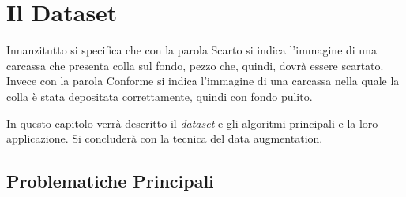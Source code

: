 
\chapter{Il Dataset}

Innanzitutto si specifica che con la parola Scarto si indica l'immagine di una carcassa che presenta colla sul fondo, pezzo che, quindi, dovrà essere scartato.
Invece con la parola Conforme si indica l'immagine di una carcassa nella quale la colla è stata depositata correttamente, quindi con fondo pulito.

In questo capitolo verrà descritto il \textit{dataset} e gli algoritmi principali e la loro applicazione.
Si concluderà con la tecnica del data augmentation.


\section{Problematiche Principali}

